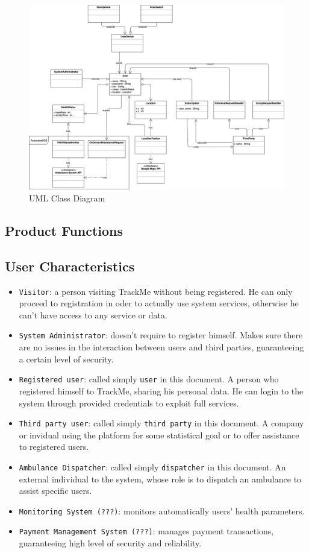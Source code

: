 \documentclass[12pt,a4paper]{article}
\begin{document}
		\begin{figure}[h]
			\includegraphics[width=1.25\linewidth]{Images/uml}
			\caption{UML Class Diagram}
			\label{fig:uml}
		\end{figure}
		
		
		\subsection{Product Functions}
		
		\subsection{User Characteristics}
			\begin{itemize}
				\item \texttt{Visitor}: a person visiting TrackMe without being registered. He can only proceed to registration in oder to actually use system services, otherwise he can't have access to any service or data.
				\item \texttt{System Administrator}: doesn't require to register himself. Makes sure there are no issues in the interaction between users and third parties, guaranteeing a certain level of security.
				\item \texttt{Registered user}: called simply \texttt{user} in this document. A person who registered himself to TrackMe, sharing his personal data. He can login to the system through provided credentials to exploit full services.
				\item \texttt{Third party user}: called simply \texttt{third party} in this document. A company or invidual using the platform for some statistical goal or to offer assistance to registered users.
				\item \texttt{Ambulance Dispatcher}: called simply \texttt{dispatcher} in this document. An external individual to the system, whose role is to dispatch an ambulance to assist specific users.
				\item \texttt{Monitoring System (???)}: monitors automatically users' health parameters.
				\item \texttt{Payment Management System (???)}: manages payment transactions, guaranteeing high level of security and reliability.
			\end{itemize}
		
\end{document}
